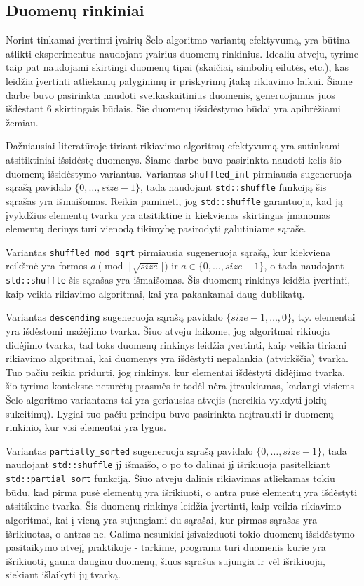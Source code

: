 \documentclass{VUMIFInfBakalaurinis}
\begin{document}
\subsection{Duomenų rinkiniai}

Norint tinkamai įvertinti įvairių Šelo algoritmo variantų efektyvumą, yra būtina atlikti eksperimentus naudojant
įvairius duomenų rinkinius.
Idealiu atveju, tyrime taip pat naudojami skirtingi duomenų tipai (skaičiai, simbolių eilutės, etc.), kas leidžia įvertinti 
atliekamų palyginimų ir priskyrimų įtaką rikiavimo laikui.
Šiame darbe buvo pasirinkta naudoti sveikaskaitinius duomenis, generuojamus juos išdėstant 6 skirtingais būdais.
Šie duomenų išsidėstymo būdai yra apibrėžiami žemiau.

Dažniausiai literatūroje tiriant rikiavimo algoritmų efektyvumą yra sutinkami atsitiktiniai išsidėstę duomenys.
Šiame darbe buvo pasirinkta naudoti kelis šio duomenų išsidėstymo variantus.
Variantas \verb|shuffled_int| pirmiausia sugeneruoja sąrašą pavidalo $\{0, \dots, size-1\}$,
tada naudojant \verb|std::shuffle| funkciją šis sąrašas yra išmaišomas.
Reikia paminėti, jog \verb|std::shuffle| garantuoja, kad ją įvykdžius elementų tvarka yra atsitiktinė ir kiekvienas
skirtingas įmanomas elementų derinys turi vienodą tikimybę pasirodyti galutiniame sąraše.

Variantas \verb|shuffled_mod_sqrt| pirmiausia sugeneruoja sąrašą, kur kiekviena reikšmė yra formos $a \pmod{\lfloor \sqrt{size} \rfloor}$ ir $a \in \{0, \dots, size-1\}$,
o tada naudojant \verb|std::shuffle| šis sąrašas yra išmaišomas.
Šis duomenų rinkinys leidžia įvertinti, kaip veikia rikiavimo algoritmai, kai yra pakankamai daug dublikatų.

Variantas \verb|descending| sugeneruoja sąrašą pavidalo $\{size-1, \dots, 0 \}$,
t.y. elementai yra išdėstomi mažėjimo tvarka.
Šiuo atveju laikome, jog algoritmai rikiuoja didėjimo tvarka, tad toks duomenų rinkinys leidžia
įvertinti, kaip veikia tiriami rikiavimo algoritmai, kai duomenys yra išdėstyti nepalankia (atvirkščia) tvarka.
Tuo pačiu reikia pridurti, jog rinkinys, kur elementai išdėstyti didėjimo tvarka, šio tyrimo kontekste neturėtų prasmės ir todėl nėra įtraukiamas,
kadangi visiems Šelo algoritmo variantams tai yra geriausias atvejis (nereikia vykdyti jokių sukeitimų).
Lygiai tuo pačiu principu buvo pasirinkta neįtraukti ir duomenų rinkinio, kur visi elementai yra lygūs.

Variantas \verb|partially_sorted| sugeneruoja sąrašą pavidalo $\{0, \dots, size-1\}$,
tada naudojant \verb|std::shuffle| jį išmaišo, o po to dalinai jį išrikiuoja pasitelkiant \verb|std::partial_sort| funkciją.
Šiuo atveju dalinis rikiavimas atliekamas tokiu būdu, kad pirma pusė elementų yra išrikiuoti, o antra pusė elementų yra išdėstyti atsitiktine tvarka.
Šis duomenų rinkinys leidžia įvertinti, kaip veikia rikiavimo algoritmai, kai į vieną yra sujungiami du sąrašai, kur pirmas sąrašas yra išrikiuotas, o antras ne.
Galima nesunkiai įsivaizduoti tokio duomenų išsidėstymo pasitaikymo atvejį praktikoje - tarkime, programa turi duomenis kurie yra išrikiuoti,
gauna daugiau duomenų, šiuos sąrašus sujungia ir vėl išrikiuoja, siekiant išlaikyti jų tvarką.
\end{document}
